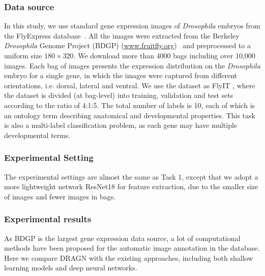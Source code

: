 \documentclass[10pt,twocolumn,letterpaper]{article}
\begin{document}
\subsubsection{Data source}
In this study, we use standard gene expression images of \emph{Drosophila} embryos from the FlyExpress database~\cite{kumar2011flyexpress}. All the images were extracted from the Berkeley \textit{Drosophila} Genome Project (BDGP) (\url{www.fruitfly.org})~\cite{tomancak2002systematic,tomancak2007global} and preprocessed to a uniform size $180\times 320$. We download more than 4000 bags including over 10,000 images. Each bag of images presents the expression distribution on the \emph{Drosophila} embryo for a single gene, in which the images were captured from different orientations, i.e. dorsal, lateral and ventral. We use the dataset as FlyIT \cite{ref27}, where the dataset is divided (at bag-level) into training, validation and test sets according to the ratio of 4:1:5. The total number of labels is 10, each of which is an ontology term describing anatomical and developmental properties. This task is also a multi-label classification problem, as each gene may have multiple developmental terms.


\subsubsection{Experimental Setting}
The experimental settings are almost the same as Task 1, except that we adopt a more lightweight network ResNet18 for feature extraction, due to the smaller size of images and fewer images in bags. 

\subsubsection{Experimental results}
As BDGP is the largest gene expression data source, a lot of computational methods have been proposed  for the automatic image annotation in the database. Here we compare DRAGN with the existing approaches, including both shallow learning models and deep neural networks. 
\end{document}

